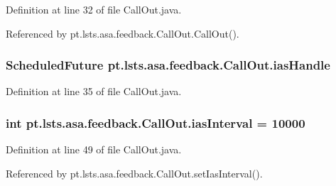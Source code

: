 Definition at line 32 of file Call\+Out.\+java.



Referenced by pt.\+lsts.\+asa.\+feedback.\+Call\+Out.\+Call\+Out().

\hypertarget{classpt_1_1lsts_1_1asa_1_1feedback_1_1CallOut_a9689da549341230842c8d930633f950f}{}
\subsubsection[{ias\+Handle}]{\setlength{\rightskip}{0pt plus 5cm}Scheduled\+Future pt.\+lsts.\+asa.\+feedback.\+Call\+Out.\+ias\+Handle\hspace{0.3cm}{\ttfamily [private]}}\label{classpt_1_1lsts_1_1asa_1_1feedback_1_1CallOut_a9689da549341230842c8d930633f950f}


Definition at line 35 of file Call\+Out.\+java.

\hypertarget{classpt_1_1lsts_1_1asa_1_1feedback_1_1CallOut_a6dda52076ca54ce6b2b2cfd9146170e7}{}
\subsubsection[{ias\+Interval}]{\setlength{\rightskip}{0pt plus 5cm}int pt.\+lsts.\+asa.\+feedback.\+Call\+Out.\+ias\+Interval = 10000\hspace{0.3cm}{\ttfamily [private]}}\label{classpt_1_1lsts_1_1asa_1_1feedback_1_1CallOut_a6dda52076ca54ce6b2b2cfd9146170e7}


Definition at line 49 of file Call\+Out.\+java.



Referenced by pt.\+lsts.\+asa.\+feedback.\+Call\+Out.\+set\+Ias\+Interval().

\hypertarget{classpt_1_1lsts_1_1asa_1_1feedback_1_1CallOut_aa25d69118ba8f8a67d9a00111f251212}{}
